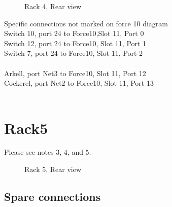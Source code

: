 \documentclass[a4paper]{article}
\begin{document}
\begin{figure}[h!]
\begin{center}
\caption{Rack 4, Rear view}
\label{fig:Rack4}
\end{center}
\end{figure}









Specific connections not marked on force 10 diagram
\\
Switch 10, port 24 to Force10,Slot 11, Port 0\\
Switch 12, port 24 to Force10, Slot 11, Port 1\\
Switch 7, port 24 to Force10, Slot 11, Port 2\\
\\
Arkell, port Net3 to Force10, Slot 11, Port 12\\
Cockerel, port Net2 to Force10, Slot 11, Port 13\\
\\


\newpage



\section{Rack5}

Please see notes 3, 4, and 5.

\begin{figure}[h!]
\begin{center}
\caption{Rack 5, Rear view}
\label{fig:Rack5}
\end{center}
\end{figure}

\subsection{Spare connections\label{ref:rack5spare}}
\end{document}
